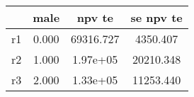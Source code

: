 \begin{table}[htbp]
\begin{tabular}{lccc} \hline \hline
 & male  & npv te  & se npv te  \\  \hline 
r1 &     0.000 & 69316.727 &  4350.407 \\  
r2 &     1.000 &  1.97e+05 & 20210.348 \\  
r3 &     2.000 &  1.33e+05 & 11253.440 \\  
\hline \hline \end{tabular}
\end{table}
